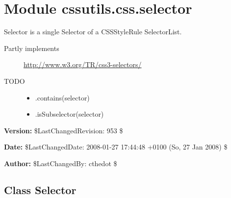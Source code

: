 %
%
%


\section{Module cssutils.css.selector}

    \label{cssutils:css:selector}

Selector is a single Selector of a CSSStyleRule SelectorList.
\begin{description}
\item[{Partly implements}] \leavevmode 
\href{http://www.w3.org/TR/css3-selectors/}{http://www.w3.org/TR/css3-selectors/}

\item[{TODO}] \leavevmode \begin{itemize}
\item {} 
.contains(selector)

\item {} 
.isSubselector(selector)

\end{itemize}

\end{description}
\textbf{Version:} \$LastChangedRevision: 953 \$



\textbf{Date:} \$LastChangedDate: 2008-01-27 17:44:48 +0100 (So, 27 Jan 2008) \$



\textbf{Author:} \$LastChangedBy: cthedot \$





\subsection{Class Selector}

